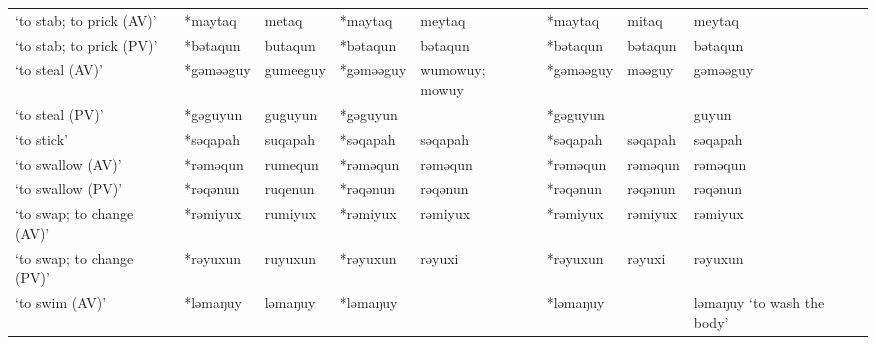 \begin{landscape}
\begin{longtable}[c]{@{}p{3cm}<{\raggedright}p{2.75cm}<{\raggedright}p{2.75cm}<{\raggedright}p{2.75cm}<{\raggedright}p{2.75cm}<{\raggedright}p{2.75cm}<{\raggedright}p{2.75cm}<{\raggedright}p{2.75cm}<{\raggedright}@{}}
`to stab; to prick (AV)'                             & *maytaq            & metaq                          & *maytaq            & meytaq                     & *maytaq          & mitaq                    & meytaq                            \\
`to stab; to prick (PV)'                             & *bətaqun           & butaqun                        & *bətaqun           & bətaqun                    & *bətaqun         & bətaqun                  & bətaqun                           \\
`to steal (AV)'                                      & *gəməəguy          & gumeeguy                       & *gəməəguy          & wumowuy; mowuy             & *gəməəguy        & məəguy                   & gəməəguy                          \\
`to steal (PV)'                                      & *gəguyun           & guguyun                        & *gəguyun           &                            & *gəguyun         &                          & guyun                             \\
`to stick'                                           & *səqapah           & suqapah                        & *səqapah           & səqapah                    & *səqapah         & səqapah                  & səqapah                           \\
`to swallow (AV)'                                    & *rəməqun           & rumequn                        & *rəməqun           & rəməqun                    & *rəməqun         & rəməqun                  & rəməqun                           \\
`to swallow (PV)'                                    & *rəqənun           & ruqenun                        & *rəqənun           & rəqənun                    & *rəqənun         & rəqənun                  & rəqənun                           \\
`to swap; to change (AV)'                            & *rəmiyux           & rumiyux                        & *rəmiyux           & rəmiyux                    & *rəmiyux         & rəmiyux                  & rəmiyux                           \\
`to swap; to change (PV)'                            & *rəyuxun           & ruyuxun                        & *rəyuxun           & rəyuxi                     & *rəyuxun         & rəyuxi                   & rəyuxun                           \\
`to swim (AV)'                                       & *ləmaŋuy           & ləmaŋuy                        & *ləmaŋuy           &                            & *ləmaŋuy         &                          & ləmaŋuy `to wash the body'        \\

\end{longtable}
\end{landscape}
